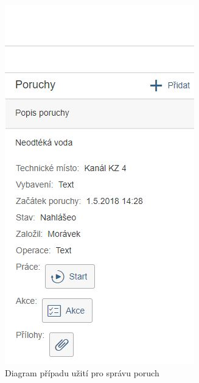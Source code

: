 \documentclass[thesis=M,czech]{FITthesis}[2012/06/26]
\begin{document}
\begin{figure}[H]
	\centering
	\includegraphics[]{images/bu_poruchy_seznam_mob}
	\caption{Diagram případu užití pro správu poruch}
	\label{img:uc_sprava_poruch}
\end{figure}
\end{document}
